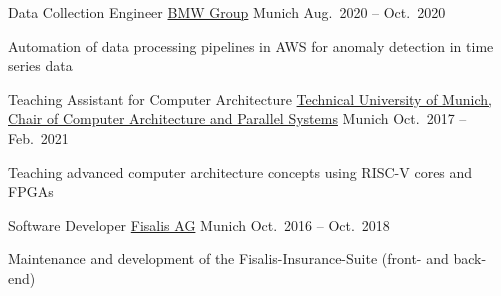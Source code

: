 \begin{cventries}
  \cventry
  {Data Collection Engineer} %
  {\href{https://www.bmwgroup.com}{BMW Group}} %
  {Munich} %
  {Aug.~2020 -- Oct.~2020} %
  {
    \begin{cvitems} %
      \item Automation of data processing pipelines in AWS for anomaly detection in time series data
    \end{cvitems}%
  }%

  \cventry
  {Teaching Assistant for Computer Architecture} %
  {\href{https://www.in.tum.de/en/caps/homepage/}{Technical University of Munich, Chair of Computer Architecture and Parallel Systems}} %
  {Munich} %
  {Oct.~2017 -- Feb.~2021} %
  {
    \begin{cvitems} %
      \item Teaching advanced computer architecture concepts using RISC-V cores and FPGAs
    \end{cvitems}
  }%

  \cventry
  {Software Developer} %
  {\href{https://www.fisalis.de/}{Fisalis AG}} %
  {Munich} %
  {Oct.~2016 -- Oct.~2018} %
  {
    \begin{cvitems} %
      \item Maintenance and development of the Fisalis-Insurance-Suite (front- and back-end)
    \end{cvitems}
  }%
\end{cventries}

